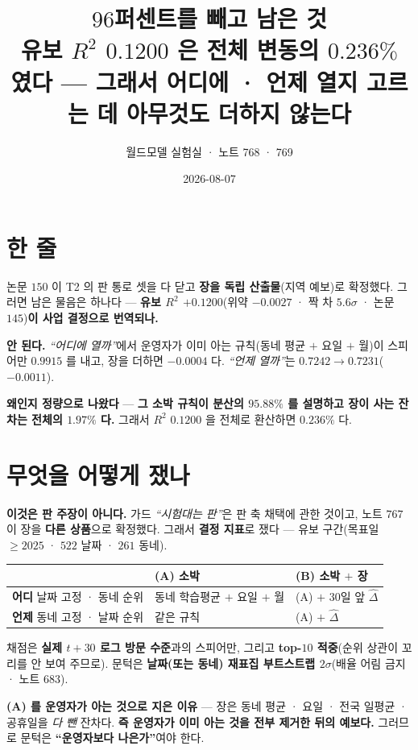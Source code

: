 \documentclass[10pt,a4paper]{article}
\title{\bfseries $96$퍼센트를 빼고 남은 것\\[2pt]
\large 유보 $R^2$ $0.1200$ 은 전체 변동의 $0.236\%$ 였다 --- 그래서 어디에 · 언제
열지 고르는 데 아무것도 더하지 않는다}
\author{월드모델 실험실 · 노트 768 · 769}
\date{2026-08-07}
\begin{document}
\maketitle

\section{한 줄}

논문 $150$ 이 T2 의 판 통로 셋을 다 닫고 \textbf{장을 독립 산출물}(지역 예보)로
확정했다. 그러면 남은 물음은 하나다 --- \textbf{유보 $R^2$ $+0.1200$}(위약 $-0.0027$ ·
짝 차 $5.6\sigma$ · 논문 $145$)\textbf{이 사업 결정으로 번역되나.}

\textbf{안 된다.} \emph{``어디에 열까''}에서 운영자가 이미 아는 규칙(동네 평균 $+$ 요일
$+$ 월)이 스피어만 \textbf{$0.9915$} 를 내고, 장을 더하면 \textbf{$-0.0004$} 다.
\emph{``언제 열까''}는 $0.7242 \to 0.7231$($\mathbf{-0.0011}$).

\textbf{왜인지 정량으로 나왔다} --- \textbf{그 소박 규칙이 분산의 $95.88\%$ 를
설명하고 장이 사는 잔차는 전체의 $1.97\%$ 다.} 그래서 $R^2$ $0.1200$ 을 전체로
환산하면 \textbf{$0.236\%$} 다.

\section{무엇을 어떻게 쟀나}

\textbf{이것은 판 주장이 아니다.} 가드 \emph{``시험대는 판''}은 판 축 채택에 관한
것이고, 노트 $767$ 이 장을 \textbf{다른 상품}으로 확정했다. 그래서 \textbf{결정
지표}로 쟀다 --- 유보 구간(목표일 $\geq 2025$ · $522$ 날짜 · $261$ 동네).

\begin{center}
\begin{tabular}{lll}
\toprule
& (A) 소박 & (B) 소박 $+$ 장 \\
\midrule
\textbf{어디} 날짜 고정 · 동네 순위 & 동네 학습평균 $+$ 요일 $+$ 월 & (A) $+$ $30$일 앞 $\hat\Delta$ \\
\textbf{언제} 동네 고정 · 날짜 순위 & 같은 규칙 & (A) $+$ $\hat\Delta$ \\
\bottomrule
\end{tabular}
\end{center}

채점은 \textbf{실제 $t{+}30$ 로그 방문 수준}과의 스피어만, 그리고 \textbf{top-$10$
적중}(순위 상관이 꼬리를 안 보여 주므로). 문턱은 \textbf{날짜(또는 동네) 재표집
부트스트랩 $2\sigma$}(배율 어림 금지 · 노트 $683$).

\textbf{(A) 를 운영자가 아는 것으로 지은 이유} --- 장은 동네 평균 · 요일 · 전국 일평균 ·
공휴일을 \emph{다 뺀} 잔차다. \textbf{즉 운영자가 이미 아는 것을 전부 제거한 뒤의
예보다.} 그러므로 문턱은 \textbf{``운영자보다 나은가''}여야 한다.
\end{document}
